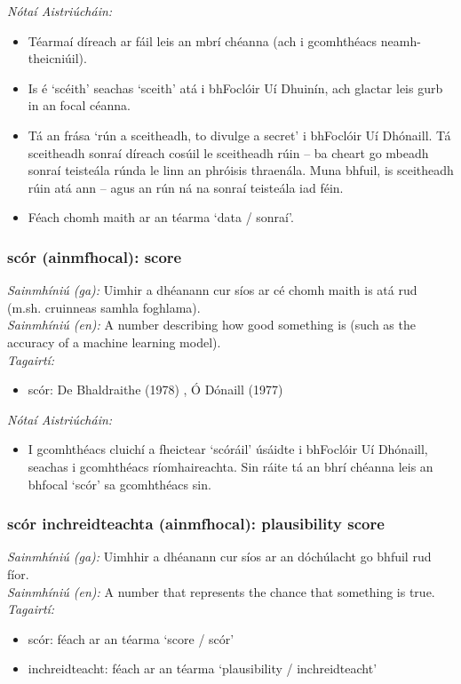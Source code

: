  \noindent \textit{Nótaí Aistriúcháin:}
\begin{itemize}
	\item Téarmaí díreach ar fáil leis an mbrí chéanna (ach i gcomhthéacs neamh-theicniúil).
	\item Is é `scéith' seachas `sceith' atá i bhFoclóir Uí Dhuinín, ach glactar leis gurb in an focal céanna.
	\item Tá an frása `rún a sceitheadh, to divulge a secret' i bhFoclóir Uí Dhónaill. Tá sceitheadh sonraí díreach cosúil le sceitheadh rúin -- ba cheart go mbeadh sonraí teisteála rúnda le linn an phróisis thraenála. Muna bhfuil, is sceitheadh rúin atá ann -- agus an rún ná na sonraí teisteála iad féin.
	\item Féach chomh maith ar an téarma `data / sonraí'.
\end{itemize}


\subsubsection*{scór (ainmfhocal): score}
 \noindent \textit{Sainmhíniú (ga):} Uimhir a dhéanann cur síos ar cé chomh maith is atá rud (m.sh. cruinneas samhla foghlama).
\\
 \noindent \textit{Sainmhíniú (en):} A number describing how good something is (such as the accuracy of a machine learning model).
\\
 \noindent \textit{Tagairtí:}
\begin{itemize}
	\item scór: De Bhaldraithe (1978) \cite{de-bhaldraithe}, Ó Dónaill (1977) \cite{odonaill}
\end{itemize}

 \noindent \textit{Nótaí Aistriúcháin:}
\begin{itemize}
	\item I gcomhthéacs cluichí a fheictear `scóráil' úsáidte i bhFoclóir Uí Dhónaill, seachas i gcomhthéacs ríomhaireachta. Sin ráite tá an bhrí chéanna leis an bhfocal `scór' sa gcomhthéacs sin.
\end{itemize}


\subsubsection*{scór inchreidteachta (ainmfhocal): plausibility score}
 \noindent \textit{Sainmhíniú (ga):} Uimhhir a dhéanann cur síos ar an dóchúlacht go bhfuil rud fíor.
\\
 \noindent \textit{Sainmhíniú (en):} A number that represents the chance that something is true.
\\
 \noindent \textit{Tagairtí:}
\begin{itemize}
	\item scór: féach ar an téarma `score / scór'
	\item inchreidteacht: féach ar an téarma `plausibility / inchreidteacht'
\end{itemize}

